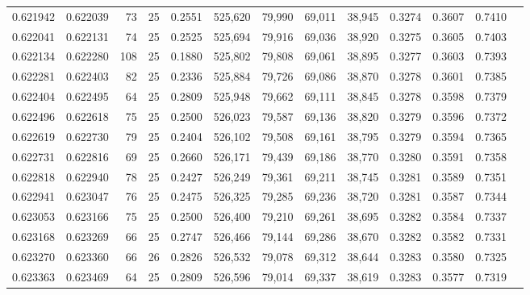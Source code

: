 \begin{tabular}{rrrrrrrrrrrrr}
0.621942 & 0.622039 &    73 &  25 &                                     0.2551 & 525,620 &  79,990 &  69,011 &  38,945 & 0.3274 & 0.3607 & 0.7410 \\
0.622041 & 0.622131 &    74 &  25 &                                     0.2525 & 525,694 &  79,916 &  69,036 &  38,920 & 0.3275 & 0.3605 & 0.7403 \\
0.622134 & 0.622280 &   108 &  25 &                                     0.1880 & 525,802 &  79,808 &  69,061 &  38,895 & 0.3277 & 0.3603 & 0.7393 \\
0.622281 & 0.622403 &    82 &  25 &                                     0.2336 & 525,884 &  79,726 &  69,086 &  38,870 & 0.3278 & 0.3601 & 0.7385 \\
0.622404 & 0.622495 &    64 &  25 &                                     0.2809 & 525,948 &  79,662 &  69,111 &  38,845 & 0.3278 & 0.3598 & 0.7379 \\
0.622496 & 0.622618 &    75 &  25 &                                     0.2500 & 526,023 &  79,587 &  69,136 &  38,820 & 0.3279 & 0.3596 & 0.7372 \\
0.622619 & 0.622730 &    79 &  25 &                                     0.2404 & 526,102 &  79,508 &  69,161 &  38,795 & 0.3279 & 0.3594 & 0.7365 \\
0.622731 & 0.622816 &    69 &  25 &                                     0.2660 & 526,171 &  79,439 &  69,186 &  38,770 & 0.3280 & 0.3591 & 0.7358 \\
0.622818 & 0.622940 &    78 &  25 &                                     0.2427 & 526,249 &  79,361 &  69,211 &  38,745 & 0.3281 & 0.3589 & 0.7351 \\
0.622941 & 0.623047 &    76 &  25 &                                     0.2475 & 526,325 &  79,285 &  69,236 &  38,720 & 0.3281 & 0.3587 & 0.7344 \\
0.623053 & 0.623166 &    75 &  25 &                                     0.2500 & 526,400 &  79,210 &  69,261 &  38,695 & 0.3282 & 0.3584 & 0.7337 \\
0.623168 & 0.623269 &    66 &  25 &                                     0.2747 & 526,466 &  79,144 &  69,286 &  38,670 & 0.3282 & 0.3582 & 0.7331 \\
0.623270 & 0.623360 &    66 &  26 &                                     0.2826 & 526,532 &  79,078 &  69,312 &  38,644 & 0.3283 & 0.3580 & 0.7325 \\
0.623363 & 0.623469 &    64 &  25 &                                     0.2809 & 526,596 &  79,014 &  69,337 &  38,619 & 0.3283 & 0.3577 & 0.7319 \\

\end{tabular}
